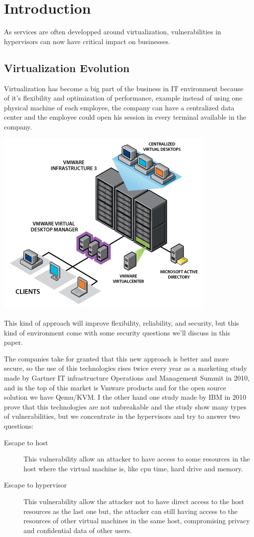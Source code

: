 \section{Introduction}
As services are often developped around virtualization, vulnerabilities in hypervisors can now
have critical impact on businesses.

\subsection{Virtualization Evolution}
Virtualization has become a big part of the business in IT environment because 
of it's flexibility and optimization of performance, example instead of using one physical
machine of each employee, the  company can have a centralized data center and the
employee could open his session in every terminal available in the company.

 \includegraphics {vdivdm_diagram.png}

This kind of approach will improve flexibility, reliability, and security,
 but this kind of environment come with some security questions we'll discuss in this paper.

The companies take for granted that this new approach is better and more secure,
so the use of this technologies rises twice every year as a marketing study made by
Gartner IT infrastructure Operations and Management Summit in 2010, and in the top
of this market is Vmware products and for the open source solution we have Qemu/KVM.
I the other hand one study made by IBM in 2010 prove that this technologies are not unbreakable
and the study show many types of vulnerabilities, but we concentrate in the hypervisors and
try to answer two questions:
\begin{description}
\item[Escape to host] This vulnerability allow an attacker to have access to some resources
in the host where the virtual machine is, like cpu time, hard drive and memory.
\item[Escape to hypervisor] This vulnerability allow the attacker not to have direct access
to the host resources as the last one but, the attacker can still having access to the resources
of other virtual machines in the same host, compromising privacy and confidential data of other users.
\end{description}

